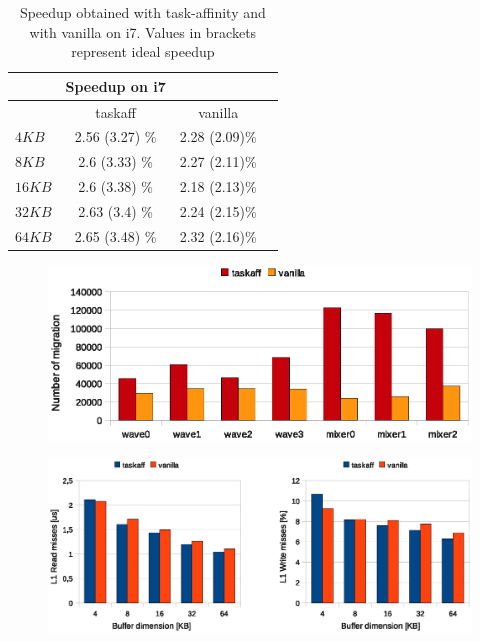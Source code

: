 \begin{table}[htbp]
\begin{center}
\begin{tabular}{l|c|c|c}
	\hline
	& Speedup on i7 \\ \hline
	& taskaff & vanilla \\ \hline
	$4KB$ & 2.56 (3.27) \% & 2.28 (2.09)\% \\ \hline
	$8KB$ & 2.6 (3.33) \% & 2.27 (2.11)\% \\ \hline
	$16KB$ & 2.6 (3.38) \% & 2.18 (2.13)\% \\ \hline
	$32KB$  & 2.63 (3.4) \% & 2.24 (2.15)\% \\ \hline
	$64KB$  & 2.65 (3.48) \% & 2.32 (2.16)\% \\ \hline
\end{tabular}
\caption{Speedup obtained with task-affinity and with vanilla on i7. Values in brackets represent ideal speedup}
\label{tab:speedup_i7}
\end{center}
\end{table}

\begin{figure}[htbp]
\centering
\includegraphics[width=\widefigure]{images/results_i7/migration_i7.eps}
\caption{}
\label{fig:migration_i7}
\end{figure}

\begin{figure}[htbp]
\centering
\includegraphics[width=\widefigure]{images/results_i7/l1_load_store_i7.eps}
\caption{}
\label{fig:l1_load_store_i7}
\end{figure}

